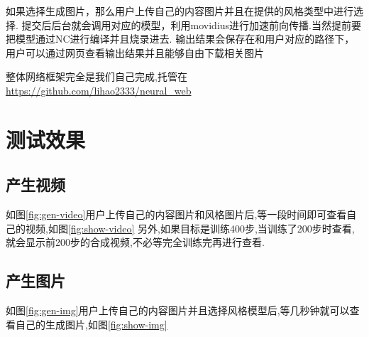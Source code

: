 如果选择生成图片，那么用户上传自己的内容图片并且在提供的风格类型中进行选择.
提交后后台就会调用对应的模型，利用movidius进行加速前向传播.当然提前要把模型通过NC进行编译并且烧录进去.
输出结果会保存在和用户对应的路径下，用户可以通过网页查看输出结果并且能够自由下载相关图片

整体网络框架完全是我们自己完成,托管在\url{https://github.com/lihao2333/neural_web}

\section{测试效果}
\subsection{产生视频}
如图\ref{fig:gen-video}用户上传自己的内容图片和风格图片后,等一段时间即可查看自己的视频,如图\ref{fig:show-video}
另外,如果目标是训练400步,当训练了200步时查看,就会显示前200步的合成视频,不必等完全训练完再进行查看.
\subsection{产生图片}
如图\ref{fig:gen-img}用户上传自己的内容图片并且选择风格模型后,等几秒钟就可以查看自己的生成图片,如图\ref{fig:show-img}
